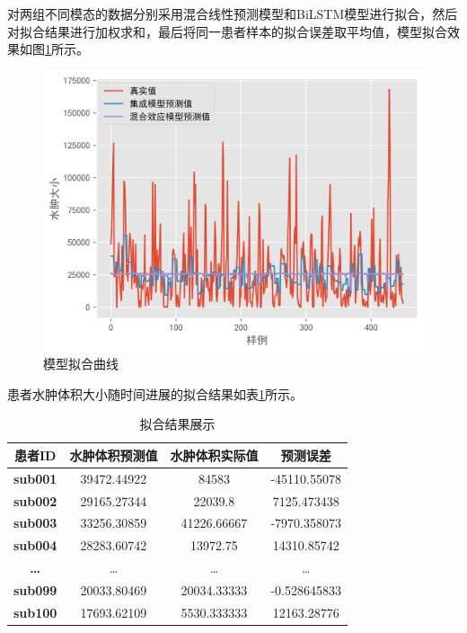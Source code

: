 \documentclass[bwprint]{gmcmthesis}
\begin{document}
对两组不同模态的数据分别采用混合线性预测模型和BiLSTM模型进行拟合，然后对拟合结果进行加权求和，最后将同一患者样本的拟合误差取平均值，模型拟合效果如图\ref{fig:2a拟合效果}所示。
\begin{figure}[h]
    \centering
    \includegraphics[width = \linewidth]{figures/p2a模型预测结果.png}
    \caption{模型拟合曲线}
    \label{fig:2a拟合效果}
\end{figure}


患者水肿体积大小随时间进展的拟合结果如表\ref{tab:4}所示。
\begin{table}[ht]
\centering
\caption{拟合结果展示}
\label{tab:4}
\fontsize{11}{9}\selectfont
\renewcommand\tabcolsep{6pt}
{
\begin{tabular}{cccc}
\toprule[1.2pt]
\textbf{患者ID}   & \textbf{水肿体积预测值} & \textbf{水肿体积实际值} & \textbf{预测误差} \\
\midrule
\textbf{sub001} & 39472.44922      & 84583            & -45110.55078  \\
\textbf{sub002} & 29165.27344      & 22039.8          & 7125.473438   \\
\textbf{sub003} & 33256.30859      & 41226.66667      & -7970.358073  \\
\textbf{sub004} & 28283.60742      & 13972.75         & 14310.85742   \\
\textbf{…}      & …                & …                & …             \\
\textbf{sub099} & 20033.80469      & 20034.33333      & -0.528645833  \\
\textbf{sub100} & 17693.62109      & 5530.333333      & 12163.28776   \\ \bottomrule[1.2pt]
\end{tabular}}
\end{table}
\end{document}
